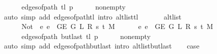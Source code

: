 \begin{isabellebody}
\ \ \ \ \ \ {\isacharparenleft}{\kern0pt}edges{\isacharunderscore}{\kern0pt}of{\isacharunderscore}{\kern0pt}path\ {\isacharparenleft}{\kern0pt}tl\ {\isacharquery}{\kern0pt}p{\isacharparenright}{\kern0pt}{\isacharparenright}{\kern0pt}{\isachardoublequoteclose}\isanewline
\ \ \ \ \isamarkupfalse%
\ non{\isacharunderscore}{\kern0pt}empty{\isacharparenleft}{\kern0pt}{}{\isacharparenright}{\kern0pt}\isanewline
\ \ \ \ \isamarkupfalse%
\ {\isacharparenleft}{\kern0pt}auto\ simp\ add{\isacharcolon}{\kern0pt}\ edges{\isacharunderscore}{\kern0pt}of{\isacharunderscore}{\kern0pt}path{\isacharunderscore}{\kern0pt}tl\ intro{\isacharcolon}{\kern0pt}\ alt{\isacharunderscore}{\kern0pt}list{\isacharunderscore}{\kern0pt}tl{\isacharparenright}{\kern0pt}\isanewline
\ \ \isamarkupfalse%
\isanewline
\ \ \ \ {\isachardoublequoteopen}alt{\isacharunderscore}{\kern0pt}list\isanewline
\ \ \ \ \ \ {\isacharparenleft}{\kern0pt}Not\ {\isasymcirc}\ {\isacharparenleft}{\kern0pt}{\isasymlambda}e{\isachardot}{\kern0pt}\ e\ {\isasymin}\ {\isacharparenleft}{\kern0pt}G{\isachardot}{\kern0pt}E\ {\isacharparenleft}{\kern0pt}G{}\ L\ R\ s\ t\ M{\isacharparenright}{\kern0pt}{\isacharparenright}{\kern0pt}{\isacharparenright}{\kern0pt}{\isacharparenright}{\kern0pt}\isanewline
\ \ \ \ \ \ {\isacharparenleft}{\kern0pt}{\isasymlambda}e{\isachardot}{\kern0pt}\ e\ {\isasymin}\ {\isacharparenleft}{\kern0pt}G{\isachardot}{\kern0pt}E\ {\isacharparenleft}{\kern0pt}G{}\ L\ R\ s\ t\ M{\isacharparenright}{\kern0pt}{\isacharparenright}{\kern0pt}{\isacharparenright}{\kern0pt}\isanewline
\ \ \ \ \ \ {\isacharparenleft}{\kern0pt}edges{\isacharunderscore}{\kern0pt}of{\isacharunderscore}{\kern0pt}path\ {\isacharparenleft}{\kern0pt}butlast\ {\isacharparenleft}{\kern0pt}tl\ {\isacharquery}{\kern0pt}p{\isacharparenright}{\kern0pt}{\isacharparenright}{\kern0pt}{\isacharparenright}{\kern0pt}{\isachardoublequoteclose}\isanewline
\ \ \ \ \isamarkupfalse%
\ non{\isacharunderscore}{\kern0pt}empty{\isacharparenleft}{\kern0pt}{}{\isacharparenright}{\kern0pt}\isanewline
\ \ \ \ \isamarkupfalse%
\ {\isacharparenleft}{\kern0pt}auto\ simp\ add{\isacharcolon}{\kern0pt}\ edges{\isacharunderscore}{\kern0pt}of{\isacharunderscore}{\kern0pt}path{\isacharunderscore}{\kern0pt}butlast\ intro{\isacharcolon}{\kern0pt}\ alt{\isacharunderscore}{\kern0pt}list{\isacharunderscore}{\kern0pt}butlast{\isacharparenright}{\kern0pt}\isanewline
\ \ \isamarkupfalse%
\ {\isacharquery}{\kern0pt}case\isanewline

\end{isabellebody}
